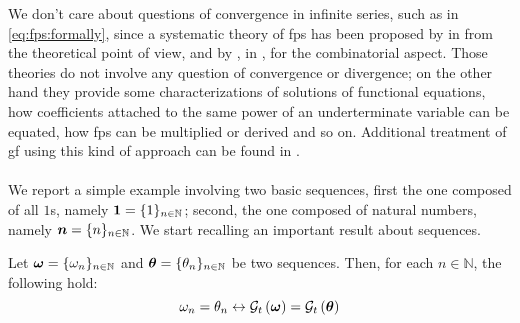 We don't care about questions of convergence in infinite series, such as in
\autoref{eq:fps:formally}, since a systematic theory of \ac{fps} has been
proposed by \citeauthor{niven:1969} in \cite{niven:1969} from the theoretical
point of view, and by \citeauthor{riordan:1964}, in \cite{riordan:1964}, for
the combinatorial aspect.  Those theories do not involve any question of
convergence or divergence; on the other hand they provide some
characterizations of solutions of functional equations, how coefficients
attached to the same power of an underterminate variable can be equated, how
\ac{fps} can be multiplied or derived and so on. Additional treatment of \ac{gf}
using this kind of approach can be found in \cite{Wilf:2006:GEN:1204575}.
\\\\
We report a simple example involving two basic sequences, first the one
composed of all $1$s, namely $\boldsymbol{1}=\lbrace1\rbrace_{n\in\mathbb{N}}$; second, the
one composed of natural numbers, namely $\boldsymbol{n}=\lbrace n\rbrace_{n\in\mathbb{N}}$.
We start recalling an important result about sequences.

\begin{theorem}
    Let $\boldsymbol{\omega}=\lbrace\omega_{n}\rbrace_{n\in\mathbb{N}}$ and 
        $\boldsymbol{\theta}=\lbrace\theta_{n}\rbrace_{n\in\mathbb{N}}$ be two sequences.
        Then, for each $n\in\mathbb{N}$, the following hold:
    \begin{displaymath}
        \omega_{n}=\theta_{n}\leftrightarrow\mathcal{G}_{t}\left(\boldsymbol{\omega}\right)
            =\mathcal{G}_{t}\left(\boldsymbol{\theta}\right)
    \end{displaymath}
    \label{thm:identity:principle}
\end{theorem}

